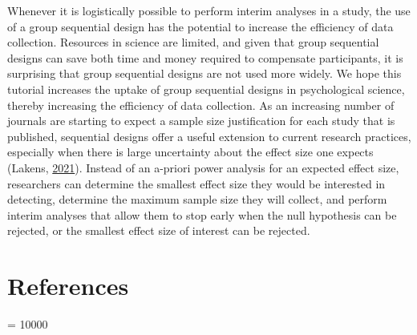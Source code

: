 \documentclass[
  english,
  ,man,floatsintext]{apa6}
\begin{document}
Whenever it is logistically possible to perform interim analyses in a study, the use of a group sequential design has the potential to increase the efficiency of data collection. Resources in science are limited, and given that group sequential designs can save both time and money required to compensate participants, it is surprising that group sequential designs are not used more widely. We hope this tutorial increases the uptake of group sequential designs in psychological science, thereby increasing the efficiency of data collection. As an increasing number of journals are starting to expect a sample size justification for each study that is published, sequential designs offer a useful extension to current research practices, especially when there is large uncertainty about the effect size one expects (Lakens, \protect\hyperlink{ref-lakens_sample_2021}{2021}). Instead of an a-priori power analysis for an expected effect size, researchers can determine the smallest effect size they would be interested in detecting, determine the maximum sample size they will collect, and perform interim analyses that allow them to stop early when the null hypothesis can be rejected, or the smallest effect size of interest can be rejected.

\hypertarget{references}{%
\section{References}\label{references}}

\begingroup

\interlinepenalty = 10000
\end{document}
